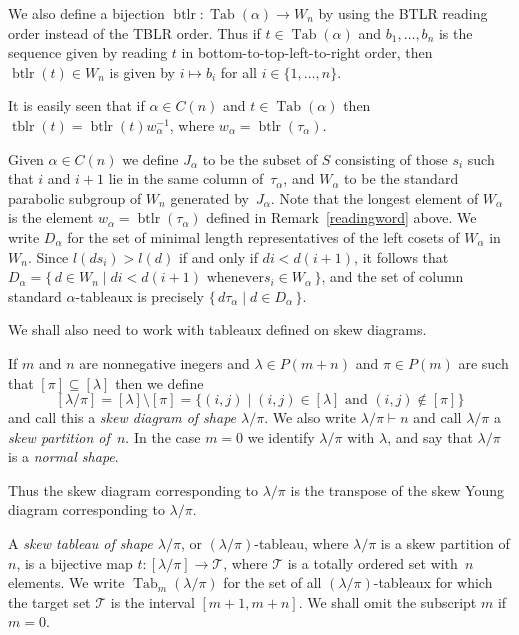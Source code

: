 \documentclass[ALCO,ThmDefs,Unicode,epreuves]{cedram}
\DeclareMathOperator{\perm}{tblr}
\DeclareMathOperator{\word}{btlr}
\DeclareMathOperator{\Tab}{Tab}
\begin{document}
We also define a bijection $\word\colon\Tab(\alpha)\to W_n$ by using the
BTLR reading order instead of the TBLR order. Thus if $t\in\Tab(\alpha)$
and $b_1,\ldots,b_n$ is the sequence given by reading $t$ in
bottom-to-top-left-to-right order, then $\word(t)\in W_n$ is given by
$i\mapsto b_i$ for all $i\in\{1,\ldots,n\}$.

\begin{rema}\label{readingword}
It is easily seen that if $\alpha\in C(n)$ and $t\in\Tab(\alpha)$ then
$\perm(t)=\word(t)w_\alpha^{-1}$, where $w_\alpha=\word(\tau_{\alpha})$.
\end{rema}

Given $\alpha\in C(n)$ we define $J_\alpha$ to be the subset
of $S$ consisting of those $s_i$ such that $i$ and $i+1$ lie in the same column
of~$\tau_\alpha$, and $W_\alpha$ to be the standard parabolic subgroup
of $W_n$ generated by~$J_\alpha$. Note that the longest element of
$W_\alpha$ is the element $w_{\alpha}=\word(\tau_{\alpha})$ defined in
Remark~\ref{readingword} above. We write
$D_{\alpha}$ for the set of minimal length representatives of the left
cosets of $W_{\alpha}$ in $W_n$. Since $l(ds_i)>l(d)$ if and
only if $di<d(i+1)$, it follows that
$D_{\alpha}=\{\,d\in W_n \mid di<d(i+1) \text{ whenever
$s_i\in W_{\alpha}$}\,\}$, and the set of column standard
$\alpha$-tableaux is precisely
$\{\,d\tau_{\alpha} \mid d\in D_{\alpha}\,\}$.

We shall also need to work with tableaux defined on skew diagrams.

\begin{defi}\label{skewpartition}\label{skewdiagram}
If $m$ and $n$ are nonnegative inegers and $\lambda\in P(m+n)$ and $\pi\in P(m)$
are such that $[\pi]\subseteq[\lambda]$ then we define
\[
[\lambda/\pi]=[\lambda]\setminus[\pi]=
\{(i,j)\mid (i,j)\in[\lambda] \text{ and } (i,j)\notin[\pi]\}
\]
and call this a \emph{skew diagram of shape $\lambda/\pi$}. We
also write $\lambda/\pi\vdash n$ and call $\lambda/\pi$ a
\emph{skew partition of~$n$}. In the case $m=0$ we identify
$\lambda/\pi$ with $\lambda$, and say that $\lambda/\pi$ is
a \emph{normal shape}.
\end{defi}

Thus the skew diagram corresponding to $\lambda/\pi$ is the
transpose of the skew Young diagram corresponding to $\lambda/\pi$.

\begin{defi}\label{skewtableau}
A \textit{skew tableau of shape $\lambda/\pi$}, or $(\lambda/\pi)$-tableau,
where $\lambda/\pi$ is a skew partition of $n$, is a bijective map
$t\colon[\lambda/\pi] \rightarrow\mathcal{T}$, where $\mathcal{T}$ is
a totally ordered set with~$n$ elements. We write $\Tab_m(\lambda/\pi)$
for the set of all $(\lambda/\pi)$-tableaux for which the target set
$\mathcal{T}$ is the interval $[m+1,m+n]$. We shall omit the subscript
$m$ if $m=0$.
\end{defi}
\end{document}
